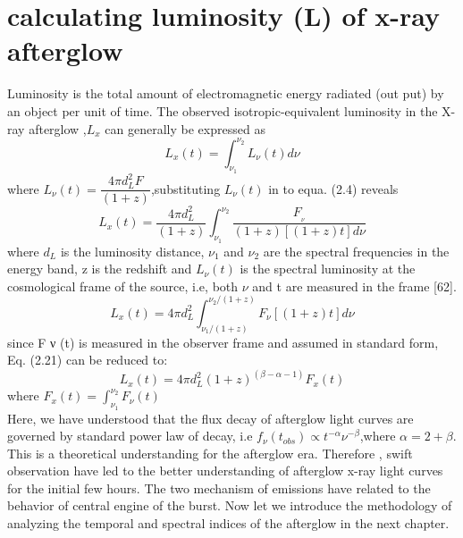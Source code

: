 \section{calculating luminosity (L) of x-ray afterglow}
Luminosity is the total amount of electromagnetic energy radiated (out put) by an  object per unit of time. The observed isotropic-equivalent luminosity in the X-ray afterglow ,$ L_{x} $ can generally be expressed as 
\begin{equation}
L_{x}(t)= \int_{\nu_{1}}^{\nu_{2}} L_{\nu}(t)d\nu
\end{equation}
 where $ L_{\nu}(t)=\dfrac{4 \pi d_{L}^{2} F} {(1+z)} $,substituting  $L_{\nu}(t)$ in to equa. (2.4) reveals 
 \begin{equation}
 L_{x}(t)=\dfrac{4 \pi d_{L}^{2}} {(1+z)}\int_{\nu_{1}}^{\nu_{2}}\frac{F_{_{\nu}}}{(1+z)[(1+z)t]d\nu} 
 \end{equation}
where $ d_{L} $ is the luminosity distance, $\nu_{1}$  and $ \nu_{2} $ are the spectral frequencies in the energy band, z is the redshift and $ L_{\nu}  (t) $ is the spectral luminosity at the cosmological frame of the source, i.e, both $\nu $ and t are  measured in the frame [62].
\begin{equation}
L_{x}(t) = 4\pi d_{L}^{2}\int_{\nu_{1}/(1+z)}^{\nu_{2}/(1+z)}F_{\nu}[(1+z)t]d\nu
\end{equation}
since F ν (t) is measured in the observer frame and assumed in standard form, Eq.
(2.21) can be reduced to:
\begin{equation}
L_{x}(t) = 4\pi d_{L}^{2}(1+z)^{(\beta-\alpha -1)} F_{x}(t)
\end{equation}
where $ F_{x}(t)  = \int _{\nu_{1}} ^{\nu_{2}}F_{\nu}(t)$ \\
Here, we have understood that the flux decay of afterglow light curves are governed by standard power law of decay, i.e $ f _{\nu}(t_{obs})  \propto t^{-\alpha} \nu^{-\beta} $,where $ \alpha = 2+\beta $. This is a theoretical understanding for the afterglow era. Therefore , swift observation have led to the better understanding of afterglow  x-ray light curves for the initial few hours. The two mechanism of emissions have related to the behavior of central engine of the burst. Now let we introduce the methodology of analyzing the temporal and spectral indices of the afterglow in the next chapter.

